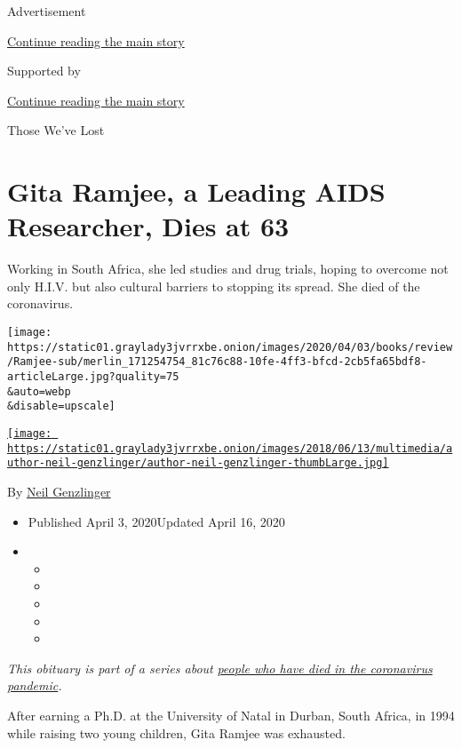Advertisement

\protect\hyperlink{after-top}{Continue reading the main story}

Supported by

\protect\hyperlink{after-sponsor}{Continue reading the main story}

Those We've Lost

\hypertarget{gita-ramjee-a-leading-aids-researcher-dies-at-63}{%
\section{Gita Ramjee, a Leading AIDS Researcher, Dies at
63}\label{gita-ramjee-a-leading-aids-researcher-dies-at-63}}

Working in South Africa, she led studies and drug trials, hoping to
overcome not only H.I.V. but also cultural barriers to stopping its
spread. She died of the coronavirus.

\texttt{[image: https://static01.graylady3jvrrxbe.onion/images/2020/04/03/books/review/Ramjee-sub/merlin\_171254754\_81c76c88-10fe-4ff3-bfcd-2cb5fa65bdf8-articleLarge.jpg?quality=75\\\&auto=webp\\\&disable=upscale]}

\href{https://www.nytimes3xbfgragh.onion/by/neil-genzlinger}{\texttt{[image: https://static01.graylady3jvrrxbe.onion/images/2018/06/13/multimedia/author-neil-genzlinger/author-neil-genzlinger-thumbLarge.jpg]}}

By \href{https://www.nytimes3xbfgragh.onion/by/neil-genzlinger}{Neil
Genzlinger}

\begin{itemize}
\item
  Published April 3, 2020Updated April 16, 2020
\item
  \begin{itemize}
  \item
  \item
  \item
  \item
  \item
  \end{itemize}
\end{itemize}

\emph{This obituary is part of a series about}
\href{https://www.nytimes3xbfgragh.onion/series/people-who-have-died-of-the-coronavirus}{\emph{people
who have died in the coronavirus pandemic}}\emph{.}

After earning a Ph.D. at the University of Natal in Durban, South
Africa, in 1994 while raising two young children, Gita Ramjee was
exhausted.

